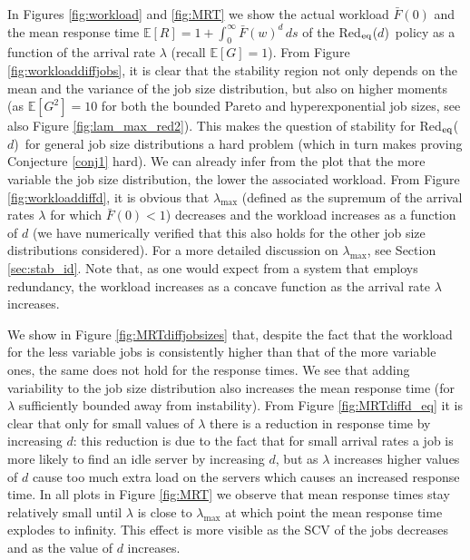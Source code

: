 \documentclass[12pt]{report}
\newcommand{\Redid}{Red$_{\textup{eq}}$($d$)}
\newcommand{\E}{\mathbb{E}}
\begin{document}
In Figures \ref{fig:workload} and \ref{fig:MRT} we show the actual workload $\bar{F}(0)$ and the mean response time $\E[R]=1+\int_0^\infty \bar{F}(w)^d \, ds$ of the \Redid\ policy as a function of the arrival rate $\lambda$ (recall $\E[G]=1$).
From Figure \ref{fig:workloaddiffjobs}, it is clear that the stability region not only depends on the mean and the variance of the job size distribution, but also on higher moments (as $\E[G^2]=10$ for both the bounded Pareto and hyperexponential job sizes, see also Figure \ref{fig:lam_max_red2}). This makes the question of stability for \Redid\ for general job size distributions a hard problem (which in turn makes proving Conjecture \ref{conj1} hard). We can already infer from the plot that the more variable the job size distribution, the lower the associated workload.
From Figure \ref{fig:workloaddiffd}, it is obvious that $\lambda_{\max}$ (defined as the supremum of the arrival rates $\lambda$ for which $\bar F(0) < 1$) decreases and the workload increases as a function of $d$ (we have numerically verified that this also holds for the other job size distributions considered). For a more detailed discussion on $\lambda_{\max}$, see Section \ref{sec:stab_id}. Note that, as one would expect from a system that employs redundancy, the workload increases as a concave function as the arrival rate $\lambda$ increases.

We show in Figure \ref{fig:MRTdiffjobsizes} that, despite the fact that the workload for the less variable jobs is consistently higher than that of the more variable ones, the same does not hold for the response times. We see that adding variability to the job size distribution also increases the mean response time (for $\lambda$ sufficiently bounded away from instability).
From Figure \ref{fig:MRTdiffd_eq} it is clear that only for small values of $\lambda$ there is a reduction in response time by increasing $d$: this reduction is due to the fact that for small arrival rates a job is more likely to find an idle server by increasing $d$, but as $\lambda$ increases higher values of $d$ cause too much extra load on the servers which causes an increased response time. In all plots in Figure \ref{fig:MRT} we observe that mean response times stay relatively small until $\lambda$ is close to $\lambda_{\max}$ at which point the mean response time explodes to infinity. This effect is more visible as the SCV of the jobs decreases and as the value of $d$ increases.
\end{document}
